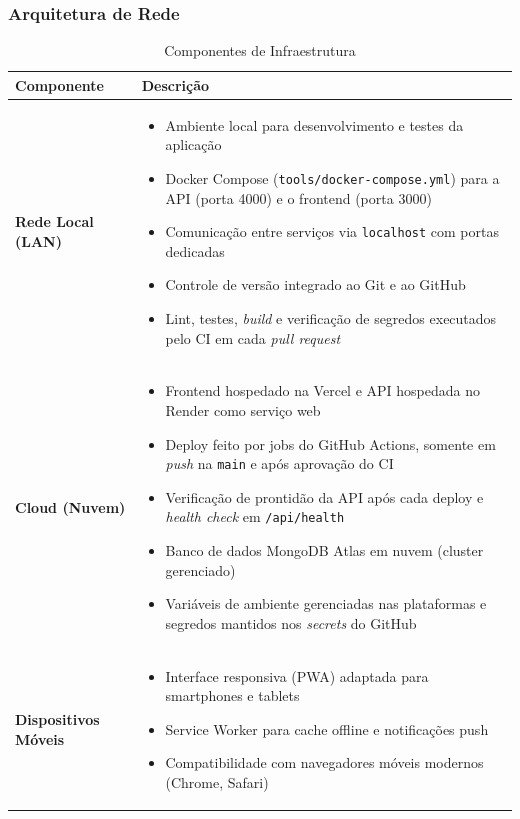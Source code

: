 \documentclass[11pt,a4paper]{article}
\begin{document}
\subsubsection{Arquitetura de Rede}
\begin{table}[H]
\centering
\caption{Componentes de Infraestrutura}
\label{tab:infrastructure}
\begin{tabular}{|l|p{10cm}|}
\hline
\textbf{Componente} & \textbf{Descrição} \\
\hline
\textbf{Rede Local (LAN)} &
\begin{itemize}[leftmargin=*, nosep]
    \item Ambiente local para desenvolvimento e testes da aplicação
    \item Docker Compose (\texttt{tools/docker-compose.yml}) para a API (porta 4000) e o frontend (porta 3000)
    \item Comunicação entre serviços via \texttt{localhost} com portas dedicadas
    \item Controle de versão integrado ao Git e ao GitHub
    \item Lint, testes, \textit{build} e verificação de segredos executados pelo CI em cada \textit{pull request}
\end{itemize} \\
\hline
\textbf{Cloud (Nuvem)} &
\begin{itemize}[leftmargin=*, nosep]
    \item Frontend hospedado na Vercel e API hospedada no Render como serviço web
    \item Deploy feito por jobs do GitHub Actions, somente em \textit{push} na \texttt{main} e após aprovação do CI
    \item Verificação de prontidão da API após cada deploy e \textit{health check} em \texttt{/api/health}
    \item Banco de dados MongoDB Atlas em nuvem (cluster gerenciado)
    \item Variáveis de ambiente gerenciadas nas plataformas e segredos mantidos nos \textit{secrets} do GitHub
\end{itemize} \\
\hline
\textbf{Dispositivos Móveis} &
\begin{itemize}[leftmargin=*, nosep]
    \item Interface responsiva (PWA) adaptada para smartphones e tablets
    \item Service Worker para cache offline e notificações push
    \item Compatibilidade com navegadores móveis modernos (Chrome, Safari)

\end{itemize}
\end{tabular}
\end{table}
\end{document}
